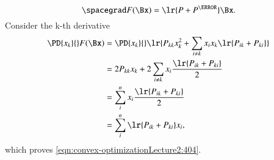 {\begin{equation}
\spacegrad F(\Bx) = \lr{P + P^\T } \Bx.
\end{equation}
%
Consider the k-th derivative
%
\begin{equation}\label{eqn:convex-optimizationLecture2:424}
\begin{aligned}
\PD{x_k}{} F(\Bx)
&=
\PD{x_k}{}
\lr{
P_{kk} x_k^2
+
\sum_{i \ne k} x_i x_k \lr{ P_{ik} + P_{ki} }
} \\
&=
2 P_{kk} x_k + 2
\sum_{i \ne k} x_i \frac{\lr{ P_{ik} + P_{ki} }}{2} \\
&=
\sum_{i}^n x_i \frac{\lr{ P_{ik} + P_{ki} }}{2} \\
&=
\sum_{i}^n \lr{ P_{ik} + P_{ki} } x_i
,
\end{aligned}
\end{equation}
%
which proves \cref{eqn:convex-optimizationLecture2:404}.
} %
